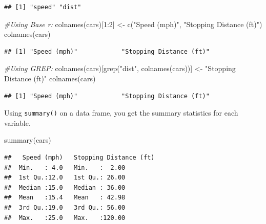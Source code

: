 \documentclass[
]{book}
\newenvironment{Shaded}{\begin{snugshade}}{\end{snugshade}}
\newcommand{\CommentTok}[1]{\textcolor[rgb]{0.56,0.35,0.01}{\textit{#1}}}
\newcommand{\DecValTok}[1]{\textcolor[rgb]{0.00,0.00,0.81}{#1}}
\newcommand{\FunctionTok}[1]{\textcolor[rgb]{0.00,0.00,0.00}{#1}}
\newcommand{\NormalTok}[1]{#1}
\newcommand{\OtherTok}[1]{\textcolor[rgb]{0.56,0.35,0.01}{#1}}
\newcommand{\SpecialCharTok}[1]{\textcolor[rgb]{0.00,0.00,0.00}{#1}}
\newcommand{\StringTok}[1]{\textcolor[rgb]{0.31,0.60,0.02}{#1}}
\begin{document}
\begin{verbatim}
## [1] "speed" "dist"
\end{verbatim}

\begin{Shaded}
\begin{Highlighting}[]
\CommentTok{\#Using Base r:}
\FunctionTok{colnames}\NormalTok{(cars)[}\DecValTok{1}\SpecialCharTok{:}\DecValTok{2}\NormalTok{] }\OtherTok{\textless{}{-}} \FunctionTok{c}\NormalTok{(}\StringTok{"Speed (mph)"}\NormalTok{, }\StringTok{"Stopping Distance (ft)"}\NormalTok{)}
\FunctionTok{colnames}\NormalTok{(cars)}
\end{Highlighting}
\end{Shaded}

\begin{verbatim}
## [1] "Speed (mph)"            "Stopping Distance (ft)"
\end{verbatim}

\begin{Shaded}
\begin{Highlighting}[]
\CommentTok{\#Using GREP:}
\FunctionTok{colnames}\NormalTok{(cars)[}\FunctionTok{grep}\NormalTok{(}\StringTok{"dist"}\NormalTok{, }\FunctionTok{colnames}\NormalTok{(cars))] }\OtherTok{\textless{}{-}} \StringTok{"Stopping Distance (ft)"}
\FunctionTok{colnames}\NormalTok{(cars)}
\end{Highlighting}
\end{Shaded}

\begin{verbatim}
## [1] "Speed (mph)"            "Stopping Distance (ft)"
\end{verbatim}

Using \texttt{summary()} on a data frame, you get the summary statistics for each variable.

\begin{Shaded}
\begin{Highlighting}[]
\FunctionTok{summary}\NormalTok{(cars)}
\end{Highlighting}
\end{Shaded}

\begin{verbatim}
##   Speed (mph)   Stopping Distance (ft)
##  Min.   : 4.0   Min.   :  2.00        
##  1st Qu.:12.0   1st Qu.: 26.00        
##  Median :15.0   Median : 36.00        
##  Mean   :15.4   Mean   : 42.98        
##  3rd Qu.:19.0   3rd Qu.: 56.00        
##  Max.   :25.0   Max.   :120.00
\end{verbatim}
\end{document}
